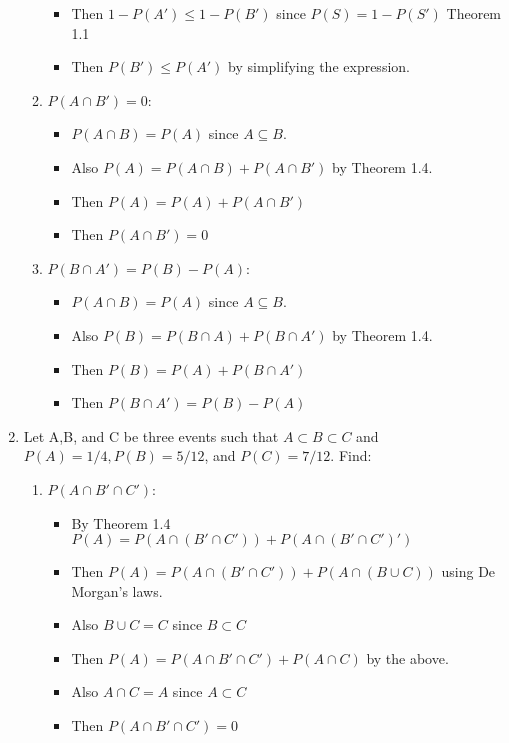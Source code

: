 \documentclass{article}
\begin{document}
\begin{enumerate}
\begin{enumerate}
\begin{itemize}
        \item Then $1 - P(A') \leq 1 - P(B')$ since $P(S) = 1 - P(S')$ Theorem 1.1
        \item Then $P(B') \leq P(A')$ by simplifying the expression.
        \end{itemize}
    \item $P(A \cap B') = 0$:
        \begin{itemize}
        \item $P(A \cap B) = P(A)$ since $A \subseteq B$.
        \item Also $P(A) = P(A \cap B) + P(A \cap B')$ by Theorem 1.4.
        \item Then $P(A) = P(A) + P(A \cap B')$
        \item Then $P(A \cap B') = 0$
        \end{itemize}
    \item $P(B \cap A') = P(B) - P(A)$:
        \begin{itemize}
        \item $P(A \cap B) = P(A)$ since $A \subseteq B$.
        \item Also $P(B) = P(B \cap A) + P(B \cap A')$ by Theorem 1.4.
        \item Then $P(B) = P(A) + P(B \cap A')$
        \item Then $P(B \cap A') = P(B) - P(A)$
        \end{itemize}
    \end{enumerate}
\item Let A,B, and C be three events such that $A \subset B \subset C$ and $P(A) = 1/4, P(B) = 5/12$,
and $P(C) = 7/12$. Find:
    \begin{enumerate}
    \item $P(A \cap B' \cap C')$:
        \begin{itemize}
        \item By Theorem 1.4 $P(A) = P(A \cap (B' \cap C')) + P(A \cap (B' \cap C')')$
        \item Then $P(A) = P(A \cap (B' \cap C')) + P(A \cap (B \cup C))$ using De Morgan's laws.
        \item Also $B \cup C = C$ since $B \subset C$
        \item Then $P(A) = P(A \cap B' \cap C') + P(A \cap C)$ by the above.
        \item Also $A \cap C = A$ since $A \subset C$
        \item Then $P(A \cap B' \cap C') = 0$
        \end{itemize}

\end{enumerate}
\end{enumerate}
\end{document}
